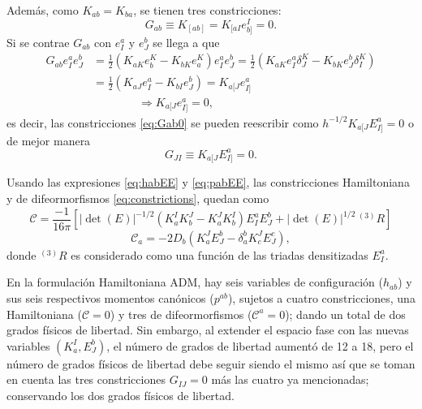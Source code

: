Adem\'{a}s, como $K_{ab} = K_{ba}$, se tienen tres constricciones:
%
\begin{equation}
\label{eq:Gab0}
G_{ab} \equiv K_{[ab]} = K_{[aI} e^{I}_{b]} = 0.
\end{equation}
%
Si se contrae $G_{ab}$ con $e^{a}_{I}$ y $e^{b}_{J}$ se llega a que
%
\begin{align*}
G_{ab} e^{a}_{I} e^{b}_{J} & = \frac{1}{2}(K_{aK} e^{K}_{b} - K_{bK} e^{K}_{a}) e^{a}_{I} e^{b}_{J} = \frac{1}{2} (K_{aK} e^{a}_{I} \delta^{K}_{J} - K_{bK} e^{b}_{J} \delta^{K}_{I}) \\
& = \frac{1}{2} (K_{aJ} e^{a}_{I} - K_{bI} e^{b}_{J}) = K_{a[J} e^{a}_{I]} \\
& \qquad \qquad \Longrightarrow K_{a[J} e^{a}_{I]} = 0,
\end{align*}
%
es decir, las constricciones \eqref{eq:Gab0} se pueden reescribir como $h^{-1/2} K_{a[J} E^{a}_{I]} = 0$ o de mejor manera
%
\begin{equation}
\label{eq:GJI0}
G_{JI} \equiv K_{a[J} E^{a}_{I]} = 0.
\end{equation}
%

Usando las expresiones \eqref{eq:habEE} y \eqref{eq:pabEE}, las constricciones Hamiltoniana y de difeormorfismos \eqref{eq:constrictions}, quedan como
%
\begin{equation}
\label{eq:CEE}
\mathcal{C} = \frac{-1}{16 \pi} [|\det(E)|^{-1/2} (K^{I}_{a} K^{J}_{b} - K^{J}_{a} K^{I}_{b}) E^{a}_{I} E^{b}_{J} + |\det(E)|^{1/2} \, ^{(3)}R]
\end{equation}
%
\begin{equation}
\label{eq:CaEE}
\mathcal{C}_{a} = -2 D_{b} (K^{J}_{a} E^{b}_{J} - \delta^{b}_{a} K^{J}_{c} E^{c}_{J}),
\end{equation}
%
donde $^{(3)}R$ es considerado como una funci\'{o}n de las triadas densitizadas $E^{a}_{I}$.

En la formulaci\'{o}n Hamiltoniana ADM, hay seis variables de configuraci\'{o}n ($h_{ab}$) y sus seis respectivos momentos can\'{o}nicos ($p^{ab}$), sujetos a cuatro constricciones, una Hamiltoniana ($\mathcal{C} = 0$) y tres de difeormorfismos ($\mathcal{C}^{a} = 0$); dando un total de dos grados f\'{i}sicos de libertad\footnotemark. Sin embargo, al extender el espacio fase con las nuevas variables $(K^{I}_{a}, E^{b}_{J})$, el n\'{u}mero de grados de libertad aument\'{o} de 12 a 18, pero el n\'{u}mero de grados f\'{i}sicos de libertad debe seguir siendo el mismo as\'{i} que se toman en cuenta las tres constricciones $G_{IJ} = 0$ m\'{a}s las cuatro ya mencionadas; conservando los dos grados f\'{i}sicos de libertad.

